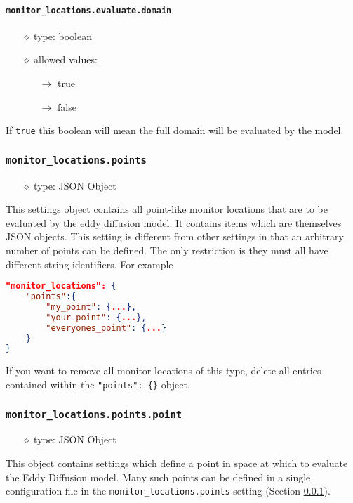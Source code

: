 \documentclass[]{article}
\def\code#1{\texttt{#1}}
\begin{document}
\paragraph{\code{monitor\_locations.evaluate.domain}}
\begin{itemize}
    \item[$\diamond$] type: boolean
    \item[$\diamond$] allowed values:
    \begin{itemize}
        \item[$\rightarrow$] true
        \item[$\rightarrow$] false
    \end{itemize}
\end{itemize}
If \code{true} this boolean will mean the full domain  will be evaluated by the
model. 


\subsubsection{\code{monitor\_locations.points}}\label{sec:monpoints}
\begin{itemize}
    \item[$\diamond$] type: JSON Object 
\end{itemize}
This settings object contains all point-like monitor locations that are to be
evaluated by the eddy diffusion model. It contains items which
are themselves JSON objects. This setting is different from other settings in
that an arbitrary number of points can be defined. The only restriction is they
must all have different string identifiers. For example\\
\begin{lstlisting}[language=json,firstnumber=1]
"monitor_locations": {
    "points":{
        "my_point": {...},
        "your_point": {...},
        "everyones_point": {...}
    }
}
\end{lstlisting}
\medskip

\noindent If you want to remove all monitor locations of this type, delete all
entries contained within the \code{"points": \{\}} object.

\subsubsection{\code{monitor\_locations.points.point}}
\begin{itemize}
    \item[$\diamond$] type: JSON Object 
\end{itemize}
This object contains settings which define a point in space at which to evaluate
the Eddy Diffusion model. Many such points can be defined in a
single configuration file in the \code{monitor\_locations.points} setting (Section
\ref{sec:monpoints}).
\end{document}
